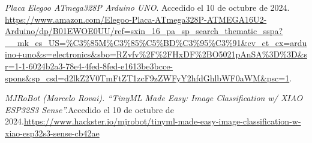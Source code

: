 \begin{thebibliography}{99}
    \textit{Placa Elegoo ATmega328P Arduino UNO}. Accedido el 10 de octubre de 2024. \url{https://www.amazon.com/Elegoo-Placa-ATmega328P-ATMEGA16U2-Arduino/dp/B01EWOE0UU/ref=sxin_16_pa_sp_search_thematic_sspa?__mk_es_US=%C3%85M%C3%85%C5%BD%C3%95%C3%91&cv_ct_cx=arduino+uno&s=electronics&sbo=RZvfv%2F%2FHxDF%2BO5021pAnSA%3D%3D&sr=1-1-6024b2a3-78e4-4fed-8fed-e1613be3bcce-spons&sp_csd=d2lkZ2V0TmFtZT1zcF9zZWFyY2hfdGhlbWF0aWM&psc=1}.

    \textit{MJRoBot (Marcelo Rovai). “TinyML Made Easy: Image Classification w/ XIAO ESP32S3 Sense”.}Accedido el 10 de octubre de 2024.\url{https://www.hackster.io/mjrobot/tinyml-made-easy-image-classification-w-xiao-esp32s3-sense-cb42ae}
    
\end{thebibliography}

